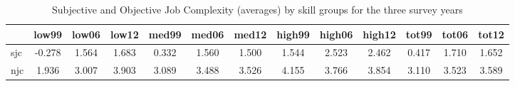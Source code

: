 \begin{table}[htbp]
\caption{\label{Tab:sjcdesc} Subjective and Objective Job Complexity (averages) by skill groups for the three survey years}\centering\medskip
\begin{tabular}{lcccccccccccc} \hline \hline
 & low99  & low06  & low12  & med99  & med06  & med12  & high99  & high06  & high12  & tot99  & tot06  & tot12  \\  \hline 
sjc &  -0.278 &   1.564 &   1.683 &   0.332 &   1.560 &   1.500 &   1.544 &   2.523 &   2.462 &   0.417 &   1.710 &   1.652 \\  
njc &   1.936 &   3.007 &   3.903 &   3.089 &   3.488 &   3.526 &   4.155 &   3.766 &   3.854 &   3.110 &   3.523 &   3.589 \\  
\hline \hline \end{tabular}
\end{table}
